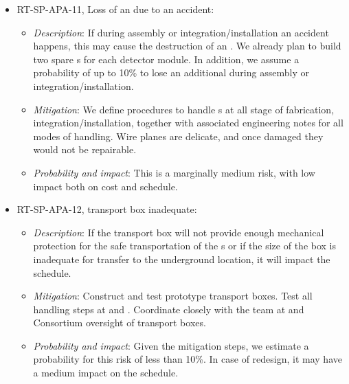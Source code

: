 \begin{itemize}
\item RT-SP-APA-11, Loss of an  due to an accident:
\begin{itemize} %
\item \textit{Description}: If during  assembly or integration/installation an accident happens, this may  cause the destruction of an . We already plan to build two spare s for each detector module. In addition, we assume a probability of up to 10\% to lose an additional  during assembly or integration/installation. 
\item \textit{Mitigation}: We define procedures to handle s at all stage of fabrication, integration/installation, together with associated engineering notes for all modes of handling. %
Wire planes are delicate, and once damaged they would not be repairable. 
\item \textit{Probability and impact}: This is a marginally medium risk, with low impact both on cost and schedule.
\end{itemize}

\item RT-SP-APA-12,  transport box inadequate:
\begin{itemize} %
\item \textit{Description}:  
If the transport box will not provide enough mechanical protection for the safe transportation of the s or if the size of the box is inadequate for transfer to the underground location, it will impact the schedule.
\item \textit{Mitigation}: Construct and test prototype transport boxes. Test all handling steps at  and . Coordinate closely with the team at  and  Consortium oversight of transport boxes.
\item \textit{Probability and impact}: Given the mitigation steps, we estimate a probability for this risk of less than 10\%. In case of redesign, it may have a medium impact on the schedule.
\end{itemize}


\end{itemize}
